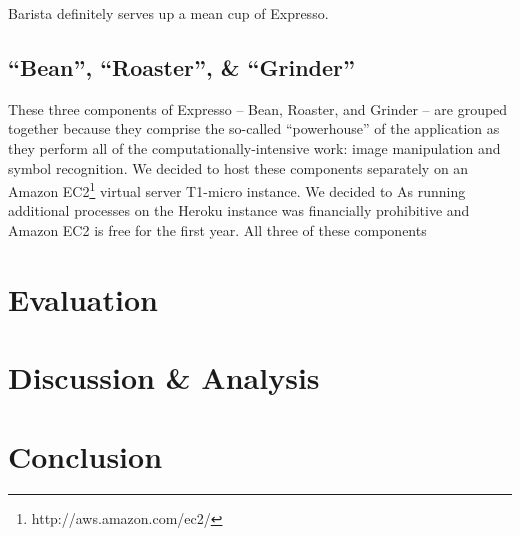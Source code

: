 \documentclass{acm_proc_article-sp}
\begin{document}
Barista definitely serves up a mean cup of Expresso.

\subsection{``Bean'', ``Roaster'', \& ``Grinder''}
These three components of Expresso -- Bean, Roaster, and Grinder -- are grouped together because they comprise the so-called ``powerhouse'' of the application as they perform all of the computationally-intensive work: image manipulation and symbol recognition. We decided to host these components separately on an Amazon EC2\footnote{http://aws.amazon.com/ec2/} virtual server T1-micro instance.  We decided to As running additional processes on the Heroku instance was financially prohibitive and Amazon EC2 is free for the first year. All three of these components 

\label{subsection:roaster}


\section{Evaluation}

\section{Discussion \& Analysis}

\section{Conclusion}



  
%
%


\balancecolumns

\end{document}
